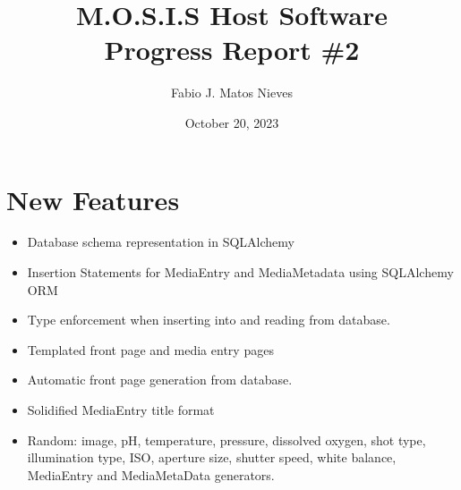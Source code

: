 \documentclass[12pt]{article}
\author{Fabio J. Matos Nieves}
\date{October 20, 2023}
\title{M.O.S.I.S Host Software\\Progress Report \#2}
\begin{document}

\tableofcontents
\newpage
\section{New Features}
\begin{itemize}
	\item Database schema representation in SQLAlchemy
	\item Insertion Statements for MediaEntry and MediaMetadata using SQLAlchemy ORM
	\item Type enforcement when inserting into and reading from database.
	\item Templated front page and media entry pages
	\item Automatic front page generation from database.
	\item Solidified MediaEntry title format
	\item Random: image, pH, temperature, pressure, dissolved oxygen, shot type, illumination type, ISO, aperture size, shutter speed, white balance, MediaEntry and MediaMetaData generators.
\end{itemize}
\end{document}
